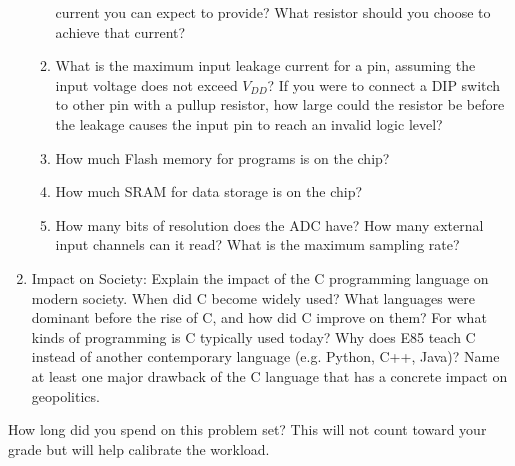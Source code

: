 \documentclass{ps}
\begin{document}
\begin{enumerate}
\begin{enumerate}
    current you can expect to provide?  What resistor should you
    choose to achieve that current?
    \begin{solution}
    \end{solution}
  \item What is the maximum input leakage current for a pin, assuming
    the input voltage does not exceed \(V_{DD}\)?  If you were to
    connect a DIP switch to other pin with a pullup resistor, how
    large could the resistor be before the leakage causes the input
    pin to reach an invalid logic level?
    \begin{solution}
    \end{solution}
  \item How much Flash memory for programs is on the chip?
    \begin{solution}
    \end{solution}
  \item How much SRAM for data storage is on the chip?
    \begin{solution}
    \end{solution}
  \item How many bits of resolution does the ADC have?  How many
    external input channels can it read?  What is the maximum sampling
    rate?
    \begin{solution}
    \end{solution}
  \end{enumerate}

\item Impact on Society: Explain the impact of the C programming
  language on modern society.  When did C become widely used?  What
  languages were dominant before the rise of C, and how did C improve
  on them?  For what kinds of programming is C typically used today?
  Why does E85 teach C instead of another contemporary language
  (e.g. Python, C++, Java)?  Name at least one major drawback of the C
  language that has a concrete impact on geopolitics.
  \begin{solution}
  \end{solution}
\end{enumerate}

How long did you spend on this problem set?  This will not count
toward your grade but will help calibrate the workload.
\begin{solution}
\end{solution}
\end{document}
